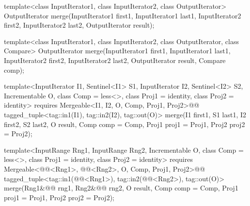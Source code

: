 %
\begin{removedblock}
\begin{itemdecl}
template<class InputIterator1, class InputIterator2,
         class OutputIterator>
  OutputIterator
    merge(InputIterator1 first1, InputIterator1 last1,
          InputIterator2 first2, InputIterator2 last2,
          OutputIterator result);

template<class InputIterator1, class InputIterator2,
         class OutputIterator, class Compare>
  OutputIterator
    merge(InputIterator1 first1, InputIterator1 last1,
          InputIterator2 first2, InputIterator2 last2,
          OutputIterator result, Compare comp);
\end{itemdecl}
\end{removedblock}
\begin{addedblock}
\begin{itemdecl}
template<InputIterator I1, Sentinel<I1> S1, InputIterator I2, Sentinel<I2> S2,
    Incrementable O, class Comp = less<>, class Proj1 = identity,
    class Proj2 = identity>
  requires Mergeable<I1, I2, O, Comp, Proj1, Proj2>@\newtxt{()}@
  tagged_tuple<tag::in1(I1), tag::in2(I2), tag::out(O)>
    merge(I1 first1, S1 last1, I2 first2, S2 last2, O result,
          Comp comp = Comp{}, Proj1 proj1 = Proj1{}, Proj2 proj2 = Proj2{});

template<InputRange Rng1, InputRange Rng2, Incrementable O, class Comp = less<>,
    class Proj1 = identity, class Proj2 = identity>
  requires Mergeable<@@<Rng1>, @@<Rng2>, O, Comp, Proj1, Proj2>@\newtxt{()}@
  tagged_tuple<tag::in1(@@<Rng1>),
               tag::in2(@@<Rng2>),
               tag::out(O)>
    merge(Rng1&@\newtxt{\&}@ rng1, Rng2&@\newtxt{\&}@ rng2, O result,
          Comp comp = Comp{}, Proj1 proj1 = Proj1{}, Proj2 proj2 = Proj2{});
\end{itemdecl}
\end{addedblock}

